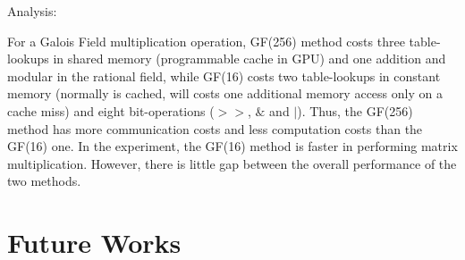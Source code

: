 \documentclass[a4paper]{article}
\begin{document}
Analysis:

For a Galois Field multiplication operation, GF(256) method costs three table-lookups in shared memory (programmable cache in GPU) and one addition and modular in the rational field, while GF(16) costs two table-lookups in constant memory (normally is cached, will costs one additional memory access only on a cache miss) and eight bit-operations ($>>$, $\&$ and $|$).
Thus, the GF(256) method has more communication costs and less computation costs than the GF(16) one.
In the experiment, the GF(16) method is faster in performing matrix multiplication.
However, there is little gap between the overall performance of the two methods.

\section{Future Works}
\end{document}
